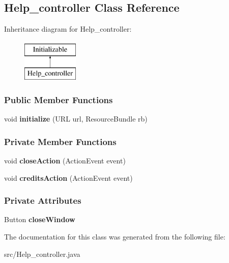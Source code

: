 \hypertarget{classHelp__controller}{}\subsection{Help\+\_\+controller Class Reference}
\label{classHelp__controller}
Inheritance diagram for Help\+\_\+controller\+:\begin{figure}[H]
\begin{center}
\leavevmode
\includegraphics[height=2.000000cm]{classHelp__controller}
\end{center}
\end{figure}
\subsubsection*{Public Member Functions}
\begin{DoxyCompactItemize}
\item 
\mbox{\label{classHelp__controller_a645340b84cb76b549a8521ca5a632833}} 
void {\bfseries initialize} (U\+RL url, Resource\+Bundle rb)
\end{DoxyCompactItemize}
\subsubsection*{Private Member Functions}
\begin{DoxyCompactItemize}
\item 
\mbox{\label{classHelp__controller_a292abe6cca2abf78d114402c61db1df6}} 
void {\bfseries close\+Action} (Action\+Event event)
\item 
\mbox{\label{classHelp__controller_a5636bfb408ced0efc154cd3933f66577}} 
void {\bfseries credits\+Action} (Action\+Event event)
\end{DoxyCompactItemize}
\subsubsection*{Private Attributes}
\begin{DoxyCompactItemize}
\item 
\mbox{\label{classHelp__controller_aece6ecdcffe2b2b21c7e8a3494de569d}} 
Button {\bfseries close\+Window}
\end{DoxyCompactItemize}


The documentation for this class was generated from the following file\+:\begin{DoxyCompactItemize}
\item 
src/Help\+\_\+controller.\+java\end{DoxyCompactItemize}
